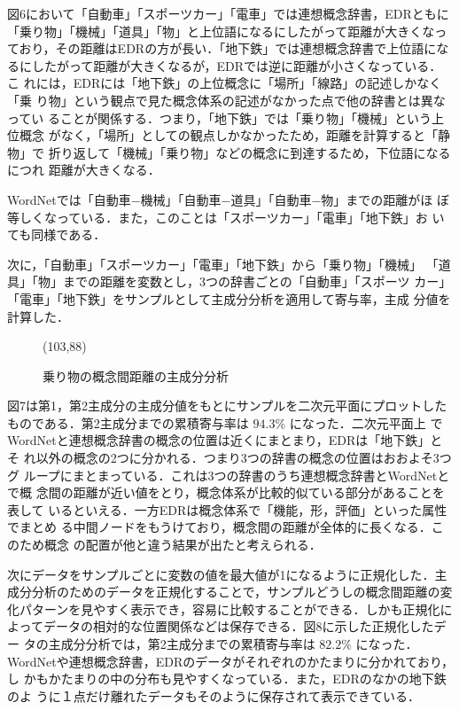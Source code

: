 図6において「自動車」「スポーツカー」「電車」では連想概念辞書，EDRともに
「乗り物」「機械」「道具」「物」と上位語になるにしたがって距離が大きくなっ
ており，その距離はEDRの方が長い．「地下鉄」では連想概念辞書で上位語にな
るにしたがって距離が大きくなるが，EDRでは逆に距離が小さくなっている．こ
れには，EDRには「地下鉄」の上位概念に「場所」「線路」の記述しかなく「乗
り物」という観点で見た概念体系の記述がなかった点で他の辞書とは異なってい
ることが関係する．つまり，「地下鉄」では「乗り物」「機械」という上位概念
がなく，「場所」としての観点しかなかったため，距離を計算すると「静物」で
折り返して「機械」「乗り物」などの概念に到達するため，下位語になるにつれ
距離が大きくなる．

WordNetでは「自動車−機械」「自動車−道具」「自動車−物」までの距離がほ
ぼ等しくなっている．また，このことは「スポーツカー」「電車」「地下鉄」お
いても同様である．

次に，「自動車」「スポーツカー」「電車」「地下鉄」から「乗り物」「機械」
「道具」「物」までの距離を変数とし，3つの辞書ごとの「自動車」「スポーツ
カー」「電車」「地下鉄」をサンプルとして主成分分析を適用して寄与率，主成
分値を計算した．

\begin{figure}[htb]
\begin{center}
\vspace*{3em}
\atari(103,88)
\vspace*{3em}
\caption{乗り物の概念間距離の主成分分析}
\end{center}
\end{figure}

図7は第1，第2主成分の主成分値をもとにサンプルを二次元平面にプロットした
ものである．第2主成分までの累積寄与率は $94.3\%$ になった．二次元平面上
でWordNetと連想概念辞書の概念の位置は近くにまとまり，EDRは「地下鉄」とそ
れ以外の概念の2つに分かれる．つまり3つの辞書の概念の位置はおおよそ3つグ
ループにまとまっている．これは3つの辞書のうち連想概念辞書とWordNetとで概
念間の距離が近い値をとり，概念体系が比較的似ている部分があることを表して
いるといえる．一方EDRは概念体系で「機能，形，評価」といった属性でまとめ
る中間ノードをもうけており，概念間の距離が全体的に長くなる．このため概念
の配置が他と違う結果が出たと考えられる．

次にデータをサンプルごとに変数の値を最大値が1になるように正規化した．主
成分分析のためのデータを正規化することで，サンプルどうしの概念間距離の変
化パターンを見やすく表示でき，容易に比較することができる．しかも正規化に
よってデータの相対的な位置関係などは保存できる．図8に示した正規化したデー
タの主成分分析では，第2主成分までの累積寄与率は $82.2\%$ になった．
WordNetや連想概念辞書，EDRのデータがそれぞれのかたまりに分かれており，し
かもかたまりの中の分布も見やすくなっている．また，EDRのなかの地下鉄のよ
うに１点だけ離れたデータもそのように保存されて表示できている．




